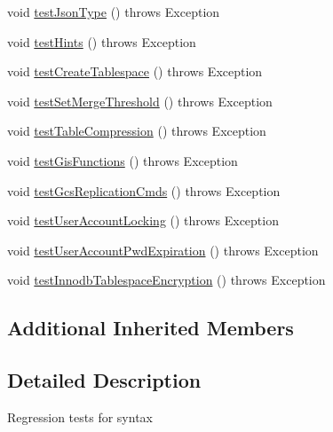 \begin{DoxyCompactItemize}
\item 
void \mbox{\hyperlink{classtestsuite_1_1regression_1_1_syntax_regression_test_a5490dab20bfc43225f9eb3fbf812e349}{test\+Json\+Type}} ()  throws Exception 
\item 
void \mbox{\hyperlink{classtestsuite_1_1regression_1_1_syntax_regression_test_a0ce60cad9433c889e455f260ea073888}{test\+Hints}} ()  throws Exception 
\item 
void \mbox{\hyperlink{classtestsuite_1_1regression_1_1_syntax_regression_test_ad1acd7d881976285b80df9ddb0a44558}{test\+Create\+Tablespace}} ()  throws Exception 
\item 
void \mbox{\hyperlink{classtestsuite_1_1regression_1_1_syntax_regression_test_a2a908e2479002b77f56fe61e6f25b244}{test\+Set\+Merge\+Threshold}} ()  throws Exception 
\item 
void \mbox{\hyperlink{classtestsuite_1_1regression_1_1_syntax_regression_test_ad83b1c216b65beb75abd988b87c801dc}{test\+Table\+Compression}} ()  throws Exception 
\item 
void \mbox{\hyperlink{classtestsuite_1_1regression_1_1_syntax_regression_test_a5093357371fd3056075bdda8c5853c9f}{test\+Gis\+Functions}} ()  throws Exception 
\item 
void \mbox{\hyperlink{classtestsuite_1_1regression_1_1_syntax_regression_test_a9382d1a11f854af3618cda075f001204}{test\+Gcs\+Replication\+Cmds}} ()  throws Exception 
\item 
void \mbox{\hyperlink{classtestsuite_1_1regression_1_1_syntax_regression_test_a3da9a690faaf10c2046b6ba25f7a092a}{test\+User\+Account\+Locking}} ()  throws Exception 
\item 
void \mbox{\hyperlink{classtestsuite_1_1regression_1_1_syntax_regression_test_a3b24b59ae1c99620e5666390a7b80119}{test\+User\+Account\+Pwd\+Expiration}} ()  throws Exception 
\item 
void \mbox{\hyperlink{classtestsuite_1_1regression_1_1_syntax_regression_test_a1f0cfdcb063613f04cf8941bdf34de94}{test\+Innodb\+Tablespace\+Encryption}} ()  throws Exception 
\end{DoxyCompactItemize}
\subsection*{Additional Inherited Members}


\subsection{Detailed Description}
Regression tests for syntax 

